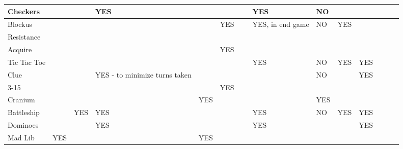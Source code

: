 \documentclass{acm_proc_article-sp}
\begin{document}
\begin{sidewaystable}[htbp]
\begin{tabular}{|p{1.3cm}||p{1cm}|p{2cm}|p{2cm}|p{1.6cm}|p{2cm}|p{1cm}|p{2cm}|p{1cm}|p{1.3cm}|p{2.7cm}|p{1cm}|p{1.6cm}|}
    Checkers & ~ & ~ & \cellcolor{blue!25}YES & ~ & ~ & ~ & \cellcolor{blue!25}YES & \cellcolor{red!25}NO & ~ & ~ & ~ & ~ \\ \hline

    Blockus & ~ & ~ & ~ & ~ & \cellcolor{blue!25}YES & ~ & \cellcolor{blue!25}YES, in end game & \cellcolor{red!25}NO & \cellcolor{blue!25}YES & ~ & ~ & ~ \\ \hline

    Resistance & ~ & ~ & ~ & ~ & ~ & ~ & ~ & ~ & ~ & ~ & ~ & ~ \\ \hline

    Acquire & ~ & ~ & ~ & ~ & \cellcolor{blue!25}YES & ~ & ~ & ~ & ~ & ~ & ~ & ~ \\ \hline

    Tic Tac Toe & ~ & ~ & ~ & ~ & ~ & ~ & \cellcolor{blue!25}YES & \cellcolor{red!25}NO & \cellcolor{blue!25}YES & \cellcolor{blue!25}YES & ~ & ~ \\ \hline

    Clue & ~ & ~ & \cellcolor{blue!25}YES - to minimize turns taken & ~ & ~ & ~ & ~ & \cellcolor{red!25}NO & ~ & \cellcolor{blue!25}YES & ~ & ~ \\ \hline

    3-15 & ~ & ~ & ~ & ~ & \cellcolor{blue!25}YES & ~ & ~ & ~ & ~ & ~ & ~ & ~ \\ \hline

    Cranium & ~ & ~ & ~ & \cellcolor{blue!25}YES & ~ & ~ & ~ & \cellcolor{blue!25}YES & ~ & ~ & ~ & ~ \\ \hline

    Battleship & ~ & \cellcolor{blue!25}YES & \cellcolor{blue!25}YES & ~ & ~ & ~ & \cellcolor{blue!25}YES & NO & \cellcolor{blue!25}YES & \cellcolor{blue!25}YES & ~ & ~ \\ \hline

    Dominoes & ~ & ~ & \cellcolor{blue!25}YES & ~ & ~ & ~ & \cellcolor{blue!25}YES & ~ & ~ & \cellcolor{blue!25}YES & ~ & ~ \\ \hline

    Mad Lib & \cellcolor{blue!25}YES & ~ & ~ & \cellcolor{blue!25}YES & ~ & ~ & ~ & ~ & ~ & ~ & ~ & ~ \\ \hline




\end{tabular}
\end{sidewaystable}
\end{document}
